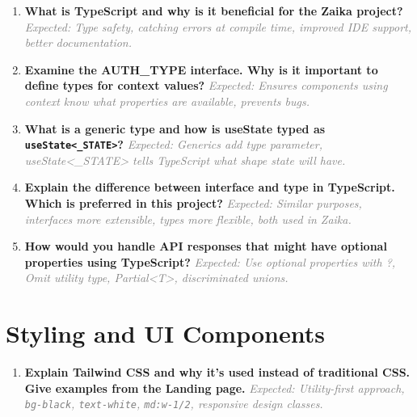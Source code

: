 \documentclass[12pt]{article}
\begin{document}
\begin{enumerate}[label=\textbf{\arabic*.}, itemsep=0.5cm, start=16]

\item \textbf{What is TypeScript and why is it beneficial for the Zaika project?}
\newline
\textcolor{gray}{\textit{Expected: Type safety, catching errors at compile time, improved IDE support, better documentation.}}

\item \textbf{Examine the AUTH\_TYPE interface. Why is it important to define types for context values?}
\newline
\textcolor{gray}{\textit{Expected: Ensures components using context know what properties are available, prevents bugs.}}

\item \textbf{What is a generic type and how is useState typed as \texttt{useState<\_STATE>}?}
\newline
\textcolor{gray}{\textit{Expected: Generics add type parameter, useState<_STATE> tells TypeScript what shape state will have.}}

\item \textbf{Explain the difference between interface and type in TypeScript. Which is preferred in this project?}
\newline
\textcolor{gray}{\textit{Expected: Similar purposes, interfaces more extensible, types more flexible, both used in Zaika.}}

\item \textbf{How would you handle API responses that might have optional properties using TypeScript?}
\newline
\textcolor{gray}{\textit{Expected: Use optional properties with ?, Omit utility type, Partial<T>, discriminated unions.}}

\end{enumerate}

\section*{Styling and UI Components}

\begin{enumerate}[label=\textbf{\arabic*.}, itemsep=0.5cm, start=21]

\item \textbf{Explain Tailwind CSS and why it's used instead of traditional CSS. Give examples from the Landing page.}
\newline
\textcolor{gray}{\textit{Expected: Utility-first approach, \texttt{bg-black}, \texttt{text-white}, \texttt{md:w-1/2}, responsive design classes.}}

\end{enumerate}
\end{document}
